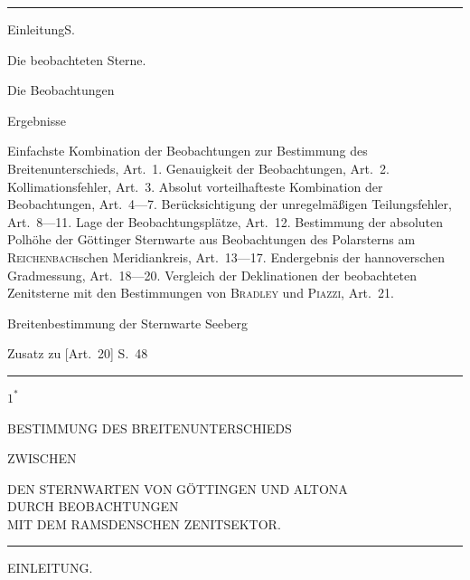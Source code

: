 \clearpage
\begin{center}
{\LARGE{}}\par\medskip
\rule{.09\textwidth}{.4pt}
\end{center}
\noindent Einleitung\dotfill S.\par
\noindent{}\quad Die beobachteten Sterne.\dotfill \quotedblbase{}\par
\noindent{}\quad Die Beobachtungen\dotfill \quotedblbase{}\par
\noindent{}\quad Ergebnisse\dotfill \quotedblbase{}\par
\noindent\hspace*{12mm}\begin{minipage}{\dimexpr\textwidth-24mm\relax}
Einfachste Kombination der Beobachtungen zur Bestimmung des Breitenunterschieds, Art.\ 1.
Genauigkeit der Beobachtungen, Art.\ 2. Kollimationsfehler, Art.\ 3.
Absolut vorteilhafteste Kombination der Beobachtungen, Art.\ 4---7.
Berücksichtigung der unregelmäßigen Teilungsfehler, Art.\ 8---11. Lage der Beobachtungsplätze, Art.\ 12.
Bestimmung der absoluten Polhöhe der Göttinger Sternwarte aus Beobachtungen des Polarsterns
am \textsc{Reichenbach}schen Meridiankreis, Art.\ 13---17. Endergebnis der hannoverschen
Gradmessung, Art.\ 18---20. Vergleich der Deklinationen der beobachteten Zenitsterne mit den
Bestimmungen von \textsc{Bradley} und \textsc{Piazzi}, Art.\ 21.
\end{minipage}\par
\noindent{}\quad Breitenbestimmung der Sternwarte Seeberg\dotfill \quotedblbase{}\par
\noindent Zusatz zu [Art.\ 20] S.\ 48\dotfill \quotedblbase{}\par
\begin{center}\rule{.23\textwidth}{.4pt}\end{center}
\vfill\begin{flushright}$1^{\ast}$\end{flushright}

\clearpage
\null

\clearpage
\vspace*{12mm}
\begin{center}
{\large BESTIMMUNG DES BREITENUNTERSCHIEDS}\par\medskip
{\small ZWISCHEN}\par\medskip
{\large DEN STERNWARTEN VON GÖTTINGEN UND ALTONA\\
DURCH BEOBACHTUNGEN\\
MIT DEM RAMSDENSCHEN ZENITSEKTOR.}\par\medskip
\rule{.12\textwidth}{.4pt}\par\bigskip
{\large EINLEITUNG.}
\end{center}


